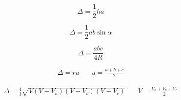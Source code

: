 \newpage
\section{
 }

\begin{figure}[h!]
	\centering
\end{figure}

\begin{equation}
	\Delta = \frac{1}{2} h a
\end{equation}

\begin{figure}[h!]
	\centering
\end{figure}

\begin{equation}
	\Delta = \frac{1}{2} a b \sin\alpha
\end{equation}

\begin{figure}[h!]
	\centering
\end{figure}

\begin{equation}
	\Delta = \frac{a b c}{4 R}
\end{equation}

\newpage

\begin{figure}[h!]
	\centering
\end{figure}

\begin{align}
	\Delta = ru & \quad u = \frac{a + b + c}{2}
\end{align}

\begin{figure}[h!]
	\centering
\end{figure}

\begin{align}
	\Delta = \frac{4}{3} \sqrt{V (V - V_a) (V - V_b) (V - V_c)} & \quad V = \frac{V_a + V_b + V_c}{2}
\end{align}
